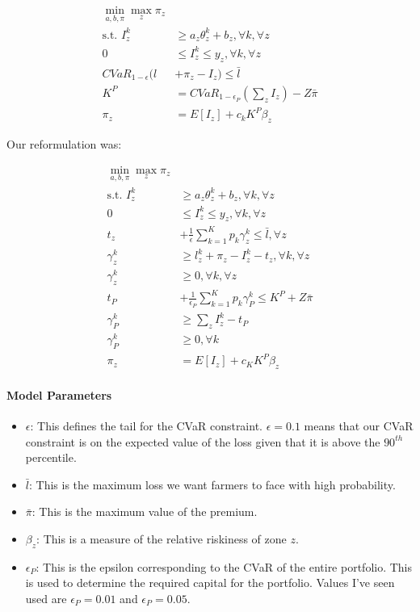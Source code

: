 \documentclass[11pt]{article}
\begin{document}
\begin{align}
    \min_{a,b,\pi} \max_z \pi_z\\
    \text{s.t.   } I_z^k &\geq a_z\theta^k_z +b_z, \forall k, \forall z\\
    0 &\leq I_z^k \leq y_z, \forall k, \forall z \\
    CVaR_{1-\epsilon}(l &+ \pi_z -I_z) \leq \bar{l} \\
    K^P &= CVaR_{1-\epsilon_P}\left (\sum_z I_z \right ) - Z\bar{\pi}\\
    \pi_z &= E[I_z]+c_k K^P \beta_z
\end{align}

Our reformulation was:  

\begin{align}
    \min_{a,b,\pi} \max_z \pi_z\\
    \text{s.t.   } I_z^k &\geq a_z\theta^k_z +b_z, \forall k, \forall z\\
    0 &\leq I_z^k \leq y_z, \forall k, \forall z \\
    t_z &+ \frac{1}{\epsilon} \sum_{k=1}^K p_k \gamma_z^k \leq \bar{l}, \forall z \\
    \gamma_z^k &\geq l_z^k + \pi_z -I_z^k -t_z, \forall k, \forall z\\
    \gamma_z^k &\geq 0, \forall k, \forall z\\
    t_P &+ \frac{1}{\epsilon_P} \sum_{k=1}^K p_k \gamma_P^k \leq K^P + Z \bar{\pi}\\
    \gamma_P^k &\geq \sum_z I_z^k -t_P\\
    \gamma_P^k &\geq 0, \forall k\\
    \pi_z &= E[I_z]+c_K K^P\beta_z
\end{align}

\paragraph*{Model Parameters}
\begin{itemize}
    \item $\epsilon$: This defines the tail for the CVaR constraint. $\epsilon = 0.1$ means that our CVaR constraint is on the expected value of the loss given that it is above the $90^{th}$ percentile. 
    \item $\bar{l}$: This is the maximum loss we want farmers to face with high probability.
    \item $\bar{\pi}$: This is the maximum value of the premium. 
    \item $\beta_z$: This is a measure of the relative riskiness of zone $z$. 
    \item $\epsilon_P$: This is the epsilon corresponding to the CVaR of the entire portfolio. This is used to determine the required capital for the portfolio. Values I've seen used are $\epsilon_P=0.01$ and $\epsilon_P=0.05$. 
\end{itemize}

\end{document}
